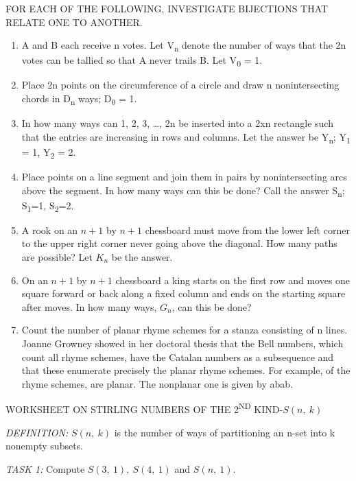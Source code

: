\documentclass[10pt,letter]{article}
\begin{document}
FOR EACH OF THE FOLLOWING, INVESTIGATE BIJECTIONS THAT RELATE ONE TO
ANOTHER.
\begin{enumerate}
\def\labelenumi{\arabic{enumi}.}

\item
  A and B each receive n votes. Let V\textsubscript{n} denote the number
  of ways that the 2n votes can be tallied so that A never trails B. Let
  V\textsubscript{0} = 1.
\item
  Place 2n points on the circumference of a circle and draw n
  nonintersecting chords in D\textsubscript{n} ways; D\textsubscript{0}
  = 1.
\item
  In how many ways can 1, 2, 3, \ldots{}, 2n be inserted into a 2xn
  rectangle such that the entries are increasing in rows and columns.
  Let the answer be Y\textsubscript{n}; Y\textsubscript{1} = 1,
  Y\textsubscript{2} = 2.
\item
  Place points on a line segment and join them in pairs by
  nonintersecting arcs above the segment. In how many ways can this be
  done? Call the answer S\textsubscript{n}; S\textsubscript{1}=1,
  S\textsubscript{2}=2.
\item
  A rook on an \(n + 1\) by \(n + 1\) chessboard must move from the
  lower left corner to the upper right corner never going above the
  diagonal. How many paths are possible? Let \(K_{n}\) be the answer.
\item
  On an \(n + 1\) by \(n + 1\) chessboard a king starts on the first row
  and moves one square forward or back along a fixed column and ends on
  the starting square after moves. In how many ways, \(G_{n}\), can this
  be done?
\item
  Count the number of planar rhyme schemes for a stanza consisting of n
  lines. Joanne Growney showed in her doctoral thesis that the Bell
  numbers, which count all rhyme schemes, have the Catalan numbers as a
  subsequence and that these enumerate precisely the planar rhyme
  schemes. For example, of the rhyme schemes, are planar. The nonplanar
  one is given by abab.

\end{enumerate}

WORKSHEET ON STIRLING NUMBERS OF THE 2\textsuperscript{ND}
KIND-\(S(n,\ k)\)

\emph{DEFINITION:} \(S\left( n,\ k \right)\) is the number of ways of
partitioning an n-set into k nonempty subsets.

\emph{TASK 1:} Compute \(S\left( 3,\ 1 \right),\ S(4,\ 1)\) and
\(S(n,\ 1)\).
\end{document}
